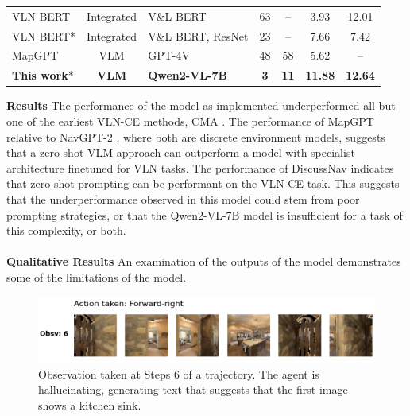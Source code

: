 \documentclass{svproc}
\begin{document}
\begin{table}
\begin{center}
\begin{tabular}{lclcccc}
                VLN BERT \cite{hong2021_vlnbert} & Integrated & V\&L BERT & 63 & -- & 3.93 & 12.01 \\
                VLN BERT* \cite{Hong_2022_CVPR} & Integrated & V\&L BERT, ResNet & 23 & -- & 7.66 & 7.42 \\
                \hline
                MapGPT \cite{chen-etal-2024-mapgpt} & VLM & GPT-4V & 48 & 58 & 5.62 & -- \\
                \textbf{This work}* & \textbf{VLM} & \textbf{Qwen2-VL-7B} & \textbf{3} & \textbf{11} & \textbf{11.88} & \textbf{12.64} \\
                \hline
            \end{tabular}
        \end{center}
    \end{table}
    \textbf{Results}  The performance of the model as implemented underperformed all but one of the earliest VLN-CE methods, CMA \cite{krantz2020navgraphvisionandlanguagenavigationcontinuous}. The performance of MapGPT \cite{chen-etal-2024-mapgpt} relative to NavGPT-2 \cite{navgpt2}, where both are discrete environment models, suggests that a zero-shot VLM approach can outperform a model with specialist architecture finetuned for VLN tasks. The performance of DiscussNav \cite{long2023_discussnav} indicates that zero-shot prompting can be performant on the VLN-CE task. This suggests that the underperformance observed in this model could stem from poor prompting strategies, or that the Qwen2-VL-7B model is insufficient for a task of this complexity, or both.
    \\ \\
    \textbf{Qualitative Results}  An examination of the outputs of the model demonstrates some of the limitations of the model.

    \begin{figure}
        \centering
        \includegraphics[scale=0.5]{figures/QUCTc6BB5sX_63289_step6.png}
        \caption{Observation taken at Steps 6 of a trajectory. The agent is hallucinating, generating text that suggests that the first image shows a kitchen sink.}
        \label{fig:fig2}
    \end{figure}
    
\end{document}
